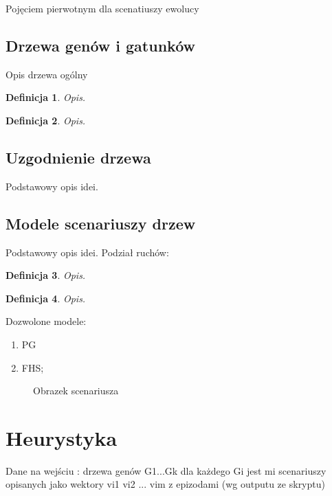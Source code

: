 \documentclass[licencjacka]{pracamgr}
\newtheorem{defi}{Definicja}[section]
\begin{document}
Pojęciem pierwotnym dla scenatiuszy ewolucy

\section{Drzewa genów i gatunków}
Opis drzewa ogólny



\begin{defi}\label{Drzewa genów}
  Opis.
\end{defi}

\begin{defi}\label{Drzewa gatunków}
  Opis.
\end{defi}

\section{Uzgodnienie drzewa}
Podstawowy opis idei.

\section{Modele scenariuszy drzew}

Podstawowy opis idei. Podział ruchów:

\begin{defi}\label{TMOVE}
  Opis.
\end{defi}

\begin{defi}\label{CLOST}
  Opis.
\end{defi}

Dozwolone modele:
\begin{enumerate}
\item PG
\item FHS;
\end{enumerate}

\begin{figure}[tp]
  \centering
  \caption{Obrazek scenariusza}
\end{figure}

\chapter{Heurystyka}\label{r:heurystyka}

Dane na wejściu : 
drzewa genów G1...Gk
dla każdego Gi jest mi scenariuszy opisanych jako wektory vi1 vi2 ... vim z epizodami (wg outputu ze skryptu)
\end{document}
